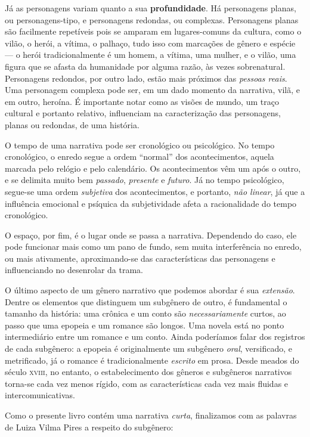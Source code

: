 \documentclass[11pt]{extarticle}
\begin{document}
Já as personagens variam quanto a sua \textbf{profundidade}. Há personagens planas, ou
personagens-tipo, e personagens redondas, ou complexas. Personagens planas
são facilmente repetíveis pois se amparam em lugares-comuns da cultura, como
o vilão, o herói, a vítima, o palhaço, tudo isso com marcações de gênero e espécie ---
o herói tradicionalmente é um homem, a vítima, uma mulher, e o vilão, uma figura que 
se afasta da humanidade por alguma razão, às vezes sobrenatural. 
Personagens redondos, por outro lado, estão mais próximos das \textit{pessoas reais}.
Uma personagem complexa pode ser, em um dado momento da narrativa, vilã, e em 
outro, heroína. É importante notar como as visões de mundo, um traço cultural e 
portanto relativo, influenciam na caracterização das personagens, planas 
ou redondas, de uma história.

O tempo de uma narrativa pode ser cronológico ou psicológico.
No tempo cronológico, o enredo segue a ordem ``normal'' dos acontecimentos,
aquela marcada pelo relógio e pelo calendário. Os acontecimentos vêm um após o 
outro, e se delimita muito bem \textit{passado}, \textit{presente} e \textit{futuro}.
Já no tempo psicológico, segue-se uma ordem \textit{subjetiva} dos acontecimentos, 
e portanto, \textit{não linear}, já que a influência emocional e psíquica 
da subjetividade afeta a racionalidade do tempo cronológico. 

O espaço, por fim, é o lugar onde se passa a narrativa. Dependendo do caso, 
ele pode funcionar mais como um pano de fundo, sem muita interferência
no enredo, ou mais ativamente, aproximando-se das características das personagens
e influenciando no desenrolar da trama. 

O último aspecto de um gênero narrativo que podemos abordar é sua 
\textit{extensão}. Dentre os elementos que distinguem um subgênero 
de outro, é fundamental o tamanho da história: uma crônica e um conto são \textit{necessariamente}
curtos, ao passo que uma epopeia e um romance são longos. Uma novela
está no ponto intermediário entre um romance e um conto.
Ainda poderíamos falar dos registros de cada subgênero: 
a epopeia é originalmente um subgênero \textit{oral}, versificado, e metrificado,
já o romance é tradicionalmente \textit{escrito} em prosa. 
Desde meados do século \textsc{xviii}, no entanto, o estabelecimento
dos gêneros e subgêneros narrativos torna-se cada vez menos rígido,
com as características cada vez mais fluidas e intercomunicativas.

Como o presente livro contém uma narrativa \textit{curta},
finalizamos com as palavras de Luiza Vilma Pires a respeito do
subgênero:
\end{document}
